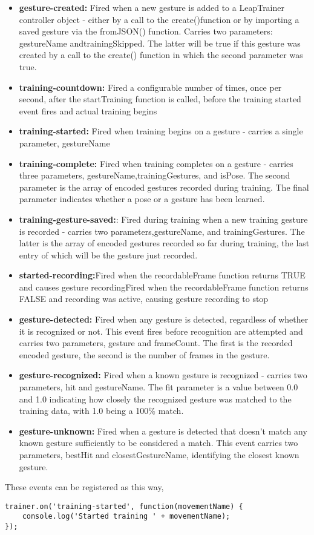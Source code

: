 \documentclass[11pt,a4paper]{article}
\begin{document}
\begin{itemize}
    \item \textbf{gesture-created:} Fired when a new gesture is added to a LeapTrainer controller object - either by a call to the create()function or by importing a saved gesture via the fromJSON() function. Carries two parameters: gestureName andtrainingSkipped. The latter will be true if this gesture was created by a call to the create() function in which the second parameter was true.
    \item \textbf{training-countdown:} Fired a configurable number of times, once per second, after the startTraining function is called, before the training started event fires and actual training begins
    \item \textbf{training-started:} Fired when training begins on a gesture - carries a single parameter, gestureName
    \item \textbf{training-complete:} Fired when training completes on a gesture - carries three parameters, gestureName,trainingGestures, and isPose. The second parameter is the array of encoded gestures recorded during training. The final parameter indicates whether a pose or a gesture has been learned.
    \item \textbf{training-gesture-saved:}: Fired during training when a new training gesture is recorded - carries two parameters,gestureName, and trainingGestures. The latter is the array of encoded gestures recorded so far during training, the last entry of which will be the gesture just recorded.
    \item \textbf{started-recording:}Fired when the recordableFrame function returns TRUE and causes gesture recordingFired when the recordableFrame function returns FALSE and recording was active, causing gesture recording to stop
    \item \textbf{gesture-detected:} Fired when any gesture is detected, regardless of whether it is recognized or not. This event fires before recognition are attempted and carries two parameters, gesture and frameCount. The first is the recorded encoded gesture, the second is the number of frames in the gesture.
    \item \textbf{gesture-recognized:} Fired when a known gesture is recognized - carries two parameters, hit and gestureName. The fit parameter is a value between 0.0 and 1.0 indicating how closely the recognized gesture was matched to the training data, with 1.0 being a 100\% match.
    \item \textbf{gesture-unknown:} Fired when a gesture is detected that doesn't match any known gesture sufficiently to be considered a match. This event carries two parameters, bestHit and closestGestureName, identifying the closest known gesture.
\end{itemize}
\vspace{.5cm}
These events can be registered as this way,
\vspace{.5cm}
\begin{lstlisting}
trainer.on('training-started', function(movementName) {
    console.log('Started training ' + movementName);
});
\end{lstlisting}
\newpage
\end{document}
